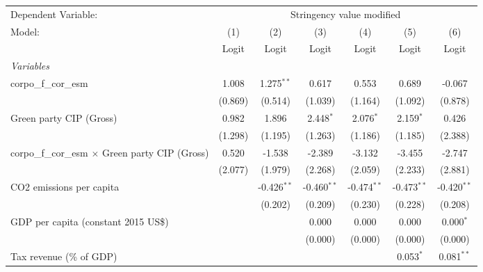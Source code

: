
\begingroup
\centering
\begin{tabular}{lcccccc}
   \toprule
   Dependent Variable: & \multicolumn{6}{c}{Stringency value modified}\\
   Model:                                                  & (1)     & (2)           & (3)           & (4)           & (5)           & (6)\\  
                                                           &  Logit  & Logit         & Logit         & Logit         & Logit         & Logit\\  
   \midrule
   \emph{Variables}\\
   corpo\_f\_cor\_esm                                      & 1.008   & 1.275$^{**}$  & 0.617         & 0.553         & 0.689         & -0.067\\   
                                                           & (0.869) & (0.514)       & (1.039)       & (1.164)       & (1.092)       & (0.878)\\   
   Green party CIP (Gross)                                 & 0.982   & 1.896         & 2.448$^{*}$   & 2.076$^{*}$   & 2.159$^{*}$   & 0.426\\   
                                                           & (1.298) & (1.195)       & (1.263)       & (1.186)       & (1.185)       & (2.388)\\   
   corpo\_f\_cor\_esm $\times$ Green party CIP (Gross)     & 0.520   & -1.538        & -2.389        & -3.132        & -3.455        & -2.747\\   
                                                           & (2.077) & (1.979)       & (2.268)       & (2.059)       & (2.233)       & (2.881)\\   
   CO2 emissions per capita                                &         & -0.426$^{**}$ & -0.460$^{**}$ & -0.474$^{**}$ & -0.473$^{**}$ & -0.420$^{**}$\\   
                                                           &         & (0.202)       & (0.209)       & (0.230)       & (0.228)       & (0.208)\\   
   GDP per capita (constant 2015 US\$)                     &         &               & 0.000         & 0.000         & 0.000         & 0.000$^{*}$\\   
                                                           &         &               & (0.000)       & (0.000)       & (0.000)       & (0.000)\\   
   Tax revenue (\% of GDP)                                 &         &               &               &               & 0.053$^{*}$   & 0.081$^{**}$\\   

\end{tabular}
